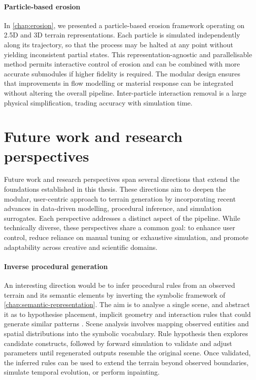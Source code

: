 \paragraph{Particle-based erosion} In \cref{chap:erosion}, we presented a particle-based erosion framework operating on 2.5D and 3D terrain representations. Each particle is simulated independently along its trajectory, so that the process may be halted at any point without yielding inconsistent partial states. This representation-agnostic and parallelisable method permits interactive control of erosion and can be combined with more accurate submodules if higher fidelity is required. The modular design ensures that improvements in flow modelling or material response can be integrated without altering the overall pipeline. Inter-particle interaction removal is a large physical simplification, trading accuracy with simulation time.

\section*{Future work and research perspectives}

Future work and research perspectives span several directions that extend the foundations established in this thesis. These directions aim to deepen the modular, user-centric approach to terrain generation by incorporating recent advances in data-driven modelling, procedural inference, and simulation surrogates. Each perspective addresses a distinct aspect of the pipeline. While technically diverse, these perspectives share a common goal: to enhance user control, reduce reliance on manual tuning or exhaustive simulation, and promote adaptability across creative and scientific domains.

\paragraph{Inverse procedural generation} An interesting direction would be to infer procedural rules from an observed terrain and its semantic elements by inverting the symbolic framework of \cref{chap:semantic-representation}. The aim is to analyse a single scene, and abstract it as  to hypothesise placement, implicit geometry \cite{Guerin2016a} and interaction rules that could generate similar patterns \cite{Stava2010,Stava2014}. Scene analysis involves mapping observed entities and spatial distributions \cite{Emilien2015a} into the symbolic vocabulary. Rule hypothesis then explores candidate constructs, followed by forward simulation to validate and adjust parameters until regenerated outputs resemble the original scene. Once validated, the inferred rules can be used to extend the terrain beyond observed boundaries, simulate temporal evolution, or perform inpainting.

